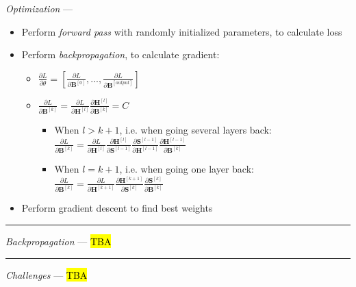 \emph{Optimization} ---
\begin{itemize}
    \item Perform \emph{forward pass} with randomly initialized parameters, to calculate loss
    \item Perform \emph{backpropagation}, to calculate gradient:
    \begin{itemize}
        \item $\frac{\partial L}{\partial \theta} = [ \frac{\partial L}{\partial \boldsymbol{B}^{[0]}} , ..., \frac{\partial L}{\partial \boldsymbol{B}^{[output]}} ]$
        \item $\frac{\partial L}{\partial \boldsymbol{B}^{[k]} } = \frac{\partial L}{ \partial \boldsymbol{H}^{[l]} } \frac{ \partial \boldsymbol{H}^{[l]} }{ \partial \boldsymbol{B}^{[k]} } = C$
        \begin{itemize}
            \item When $l > k+1$, i.e. when going several layers back: $\frac{\partial L}{\partial \boldsymbol{B}^{[k]} } = \frac{\partial L}{ \partial \boldsymbol{H}^{[l]} }  \frac{ \partial \boldsymbol{H}^{[l]} }{ \partial \boldsymbol{S}^{[l-1]} } \frac{ \partial \boldsymbol{S}^{[l-1]} }{ \partial \boldsymbol{H}^{[l-1]} } \frac{ \partial \boldsymbol{H}^{[l-1]} }{ \partial \boldsymbol{B}^{[k]} }$ 
            \item When $l = k+1$, i.e. when going one layer back: $\frac{\partial L}{\partial \boldsymbol{B}^{[k]} } = \frac{\partial L}{ \partial \boldsymbol{H}^{[k+1]} }  \frac{ \partial \boldsymbol{H}^{[k+1]} }{ \partial \boldsymbol{S}^{[k]} } \frac{ \partial \boldsymbol{S}^{[k]} }{ \partial \boldsymbol{B}^{[k]} }$
        \end{itemize}
    \end{itemize}
    \item Perform gradient descent to find best weights 
\end{itemize}

{\color{lightgray}\hrule height 0.001mm}

\emph{Backpropagation} --- \hl{TBA}

{\color{lightgray}\hrule height 0.001mm}

\emph{Challenges} --- \hl{TBA}